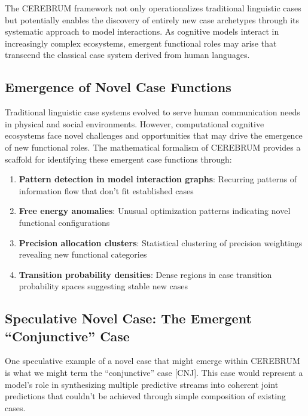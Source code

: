 \documentclass[
]{book}
\providecommand{\tightlist}{%
  \setlength{\itemsep}{0pt}\setlength{\parskip}{0pt}}
\begin{document}
The CEREBRUM framework not only operationalizes traditional linguistic
cases but potentially enables the discovery of entirely new case
archetypes through its systematic approach to model interactions. As
cognitive models interact in increasingly complex ecosystems, emergent
functional roles may arise that transcend the classical case system
derived from human languages.

\hypertarget{emergence-of-novel-case-functions}{%
\subsection{Emergence of Novel Case
Functions}\label{emergence-of-novel-case-functions}}

Traditional linguistic case systems evolved to serve human communication
needs in physical and social environments. However, computational
cognitive ecosystems face novel challenges and opportunities that may
drive the emergence of new functional roles. The mathematical formalism
of CEREBRUM provides a scaffold for identifying these emergent case
functions through:

\begin{enumerate}
\def\labelenumi{\arabic{enumi}.}
\tightlist
\item
  \textbf{Pattern detection in model interaction graphs}: Recurring
  patterns of information flow that don't fit established cases
\item
  \textbf{Free energy anomalies}: Unusual optimization patterns
  indicating novel functional configurations
\item
  \textbf{Precision allocation clusters}: Statistical clustering of
  precision weightings revealing new functional categories
\item
  \textbf{Transition probability densities}: Dense regions in case
  transition probability spaces suggesting stable new cases
\end{enumerate}

\hypertarget{speculative-novel-case-the-emergent-conjunctive-case}{%
\subsection{Speculative Novel Case: The Emergent ``Conjunctive''
Case}\label{speculative-novel-case-the-emergent-conjunctive-case}}

One speculative example of a novel case that might emerge within
CEREBRUM is what we might term the ``conjunctive'' case {[}CNJ{]}. This
case would represent a model's role in synthesizing multiple predictive
streams into coherent joint predictions that couldn't be achieved
through simple composition of existing cases.
\end{document}
